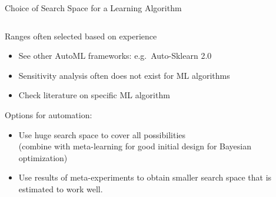 \begin{frame}{Choice of Search Space for a Learning Algorithm}
  \begin{columns}
    \begin{column}{0.6\textwidth}
    Ranges often selected based on experience
    \begin{itemize}
      \item See other AutoML frameworks: e.g.\ Auto-Sklearn 2.0~
      \item Sensitivity analysis often does not exist for ML algorithms
      \item Check literature on specific ML algorithm
    \end{itemize}
    Options for automation:
    \begin{itemize}
      \item Use huge search space to cover all possibilities \\ 
            (combine with meta-learning for good initial design for Bayesian optimization)
      \item Use results of meta-experiments to obtain smaller search space that is estimated to work well.
    \end{itemize}
    \end{column}%
    \begin{column}{0.4\textwidth}
      \begin{center}
\end{center}
\end{column}
\end{columns}
\end{frame}
